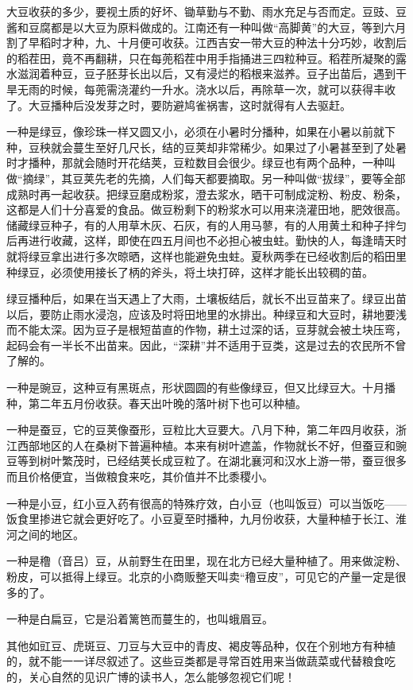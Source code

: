 \documentclass[12pt,UTF8]{ctexbook}
\begin{document}
大豆收获的多少，要视土质的好坏、锄草勤与不勤、雨水充足与否而定。豆豉、豆酱和豆腐都是以大豆为原料做成的。江南还有一种叫做“高脚黄”的大豆，等到六月割了早稻时才种，九、十月便可收获。江西吉安一带大豆的种法十分巧妙，收割后的稻茬田，竟不再翻耕，只在每蔸稻茬中用手指捅进三四粒种豆。稻茬所凝聚的露水滋润着种豆，豆子胚芽长出以后，又有浸烂的稻根来滋养。豆子出苗后，遇到干旱无雨的时候，每蔸需浇灌约一升水。浇水以后，再除草一次，就可以获得丰收了。大豆播种后没发芽之时，要防避鸠雀祸害，这时就得有人去驱赶。

一种是绿豆，像珍珠一样又圆又小，必须在小暑时分播种，如果在小暑以前就下种，豆秧就会蔓生至好几尺长，结的豆荚却非常稀少。如果过了小暑甚至到了处暑时才播种，那就会随时开花结荚，豆粒数目会很少。绿豆也有两个品种，一种叫做“摘绿”，其豆荚先老的先摘，人们每天都要摘取。另一种叫做“拔绿”，要等全部成熟时再一起收获。把绿豆磨成粉浆，澄去浆水，晒干可制成淀粉、粉皮、粉条，这都是人们十分喜爱的食品。做豆粉剩下的粉浆水可以用来浇灌田地，肥效很高。储藏绿豆种子，有的人用草木灰、石灰，有的人用马蓼，有的人用黄土和种子拌匀后再进行收藏，这样，即使在四五月间也不必担心被虫蛀。勤快的人，每逢晴天时就将绿豆拿出进行多次晾晒，这样也能避免虫蛀。夏秋两季在已经收割后的稻田里种绿豆，必须使用接长了柄的斧头，将土块打碎，这样才能长出较稠的苗。

绿豆播种后，如果在当天遇上了大雨，土壤板结后，就长不出豆苗来了。绿豆出苗以后，要防止雨水浸泡，应该及时将田地里的水排出。种绿豆和大豆时，耕地要浅而不能太深。因为豆子是根短苗直的作物，耕土过深的话，豆芽就会被土块压弯，起码会有一半长不出苗来。因此，“深耕”并不适用于豆类，这是过去的农民所不曾了解的。

一种是豌豆，这种豆有黑斑点，形状圆圆的有些像绿豆，但又比绿豆大。十月播种，第二年五月份收获。春天出叶晚的落叶树下也可以种植。

一种是蚕豆，它的豆荚像蚕形，豆粒比大豆要大。八月下种，第二年四月收获，浙江西部地区的人在桑树下普遍种植。本来有树叶遮盖，作物就长不好，但蚕豆和豌豆等到树叶繁茂时，已经结荚长成豆粒了。在湖北襄河和汉水上游一带，蚕豆很多而且价格便宜，当做粮食来吃，其价值并不比黍稷小。

一种是小豆，红小豆入药有很高的特殊疗效，白小豆（也叫饭豆）可以当饭吃——饭食里掺进它就会更好吃了。小豆夏至时播种，九月份收获，大量种植于长江、淮河之间的地区。

一种是穞（音吕）豆，从前野生在田里，现在北方已经大量种植了。用来做淀粉、粉皮，可以抵得上绿豆。北京的小商贩整天叫卖“穞豆皮”，可见它的产量一定是很多的了。

一种是白扁豆，它是沿着篱笆而蔓生的，也叫蛾眉豆。

其他如豇豆、虎斑豆、刀豆与大豆中的青皮、褐皮等品种，仅在个别地方有种植的，就不能一一详尽叙述了。这些豆类都是寻常百姓用来当做蔬菜或代替粮食吃的，关心自然的见识广博的读书人，怎么能够忽视它们呢！
\end{document}
